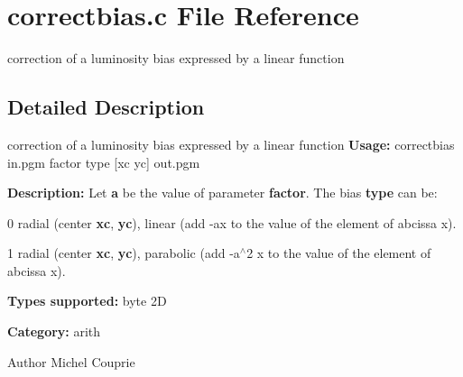 \section{correctbias.c File Reference}
\label{correctbias_8c}


correction of a luminosity bias expressed by a linear function  




\subsection{Detailed Description}
correction of a luminosity bias expressed by a linear function {\bfseries Usage:} correctbias in.pgm factor type [xc yc] out.pgm

{\bfseries Description:} Let {\bfseries a} be the value of parameter {\bfseries factor}. The bias {\bfseries type} can be: \begin{DoxyItemize}
\item 0 radial (center {\bfseries xc}, {\bfseries yc}), linear (add -\/ax to the value of the element of abcissa x). \item 1 radial (center {\bfseries xc}, {\bfseries yc}), parabolic (add -\/a$^\wedge$2 x to the value of the element of abcissa x).\end{DoxyItemize}
{\bfseries Types supported:} byte 2D

{\bfseries Category:} arith

\begin{DoxyAuthor}{Author}
Michel Couprie 
\end{DoxyAuthor}
